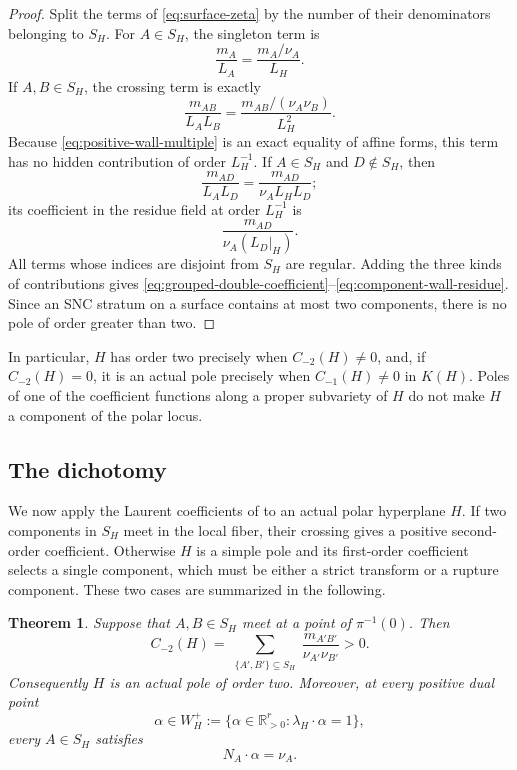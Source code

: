 \documentclass[12pt]{amsart}
\numberwithin{equation}{section}
\theoremstyle{plain}
\newtheorem{theorem}{Theorem}[section]
\theoremstyle{definition}
\theoremstyle{remark}
\theoremstyle{definition}
\newcommand{\R}{\mathbb R}
\begin{document}
\begin{proof}
Split the terms of \eqref{eq:surface-zeta} by the number of their denominators belonging to $S_H$. For $A\in S_H$, the singleton term is
\[
 \frac{m_A}{L_A}
 =
 \frac{m_A/\nu_A}{L_H}.
\]
If $A,B\in S_H$, the crossing term is exactly
\[
 \frac{m_{AB}}{L_AL_B}
 =
 \frac{m_{AB}/(\nu_A\nu_B)}{L_H^2}.
\]
Because \eqref{eq:positive-wall-multiple} is an exact equality of affine forms, this term has no hidden contribution of order $L_H^{-1}$. If $A\in S_H$ and $D\notin S_H$, then
\[
 \frac{m_{AD}}{L_AL_D}
 =
 \frac{m_{AD}}{\nu_A L_HL_D};
\]
its coefficient in the residue field at order $L_H^{-1}$ is
\[
 \frac{m_{AD}}{\nu_A(L_D|_H)}.
\]
All terms whose indices are disjoint from $S_H$ are regular. Adding the three kinds of contributions gives \eqref{eq:grouped-double-coefficient}--\eqref{eq:component-wall-residue}. Since an SNC stratum on a surface contains at most two components, there is no pole of order greater than two.
\end{proof}

In particular, $H$ has order two precisely when $C_{-2}(H)\ne0$, and, if $C_{-2}(H)=0$, it is an actual pole precisely when $C_{-1}(H)\ne0$ in $K(H)$. Poles of one of the coefficient functions along a proper subvariety of $H$ do not make $H$ a component of the polar locus.

\subsection{The dichotomy}

We now apply the Laurent coefficients of  to an actual polar hyperplane $H$. If two components in $S_H$ meet in the local fiber, their crossing gives a positive second-order coefficient. Otherwise $H$ is a simple pole and its first-order coefficient selects a single component, which must be either a strict transform or a rupture component. These two cases are summarized in the following.


\begin{theorem}
\label{thm:same-wall-positivity}
Suppose that $A,B\in S_H$ meet at a point of $\pi^{-1}(0)$. Then
\begin{equation}\label{eq:positive-double-coefficient}
    C_{-2}(H) = \sum_{\substack{\{A',B'\}\subseteq S_H}}\frac{m_{A'B'}}{\nu_{A'}\nu_{B'}}>0.
\end{equation}
Consequently $H$ is an actual pole of order two. Moreover, at every positive dual point
\begin{equation}\label{eq:positive-dual-wall}
    \alpha\in W_H^+ := \{\alpha\in\R_{>0}^r:\lambda_H\cdot\alpha=1\},
\end{equation}
every $A\in S_H$ satisfies 
\begin{equation} \label{eq:same-wall-zero-index}
N_A\cdot\alpha=\nu_A.
\end{equation}

\end{theorem}
\end{document}
